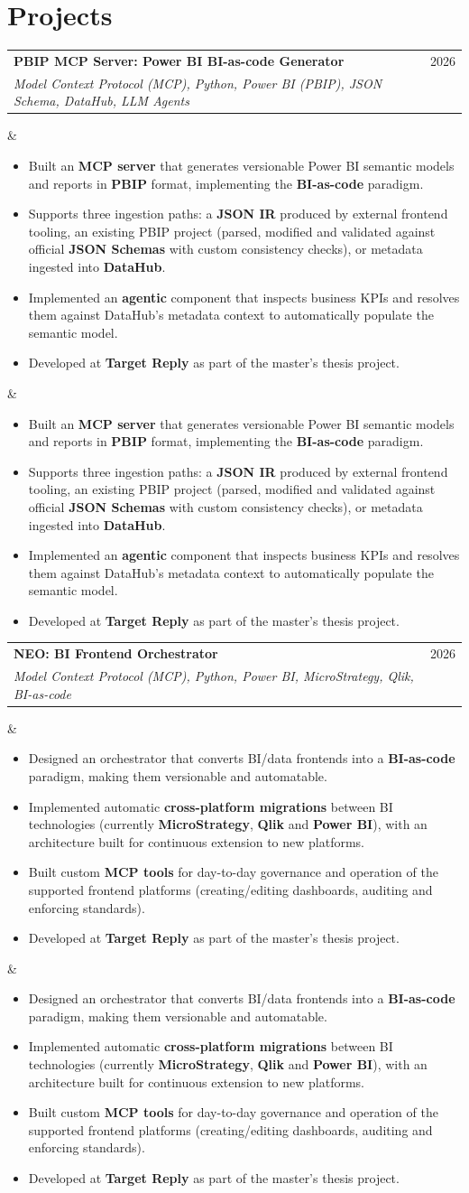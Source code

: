 \documentclass[10pt,a4paper]{article}
\makeatletter
\newcommand{\entry}[4]{%
  \noindent\begin{tabularx}{\linewidth}{@{}X r@{}}
    \textbf{#1} & #3 \\
    \textit{#2} & \\
  \end{tabularx}\vspace{-4pt}
  \ifx&#4&\else\par#4\fi
}
\makeatother
\begin{document}
\section*{Projects}

\entry{PBIP MCP Server: Power BI BI-as-code Generator}{Model Context Protocol (MCP), Python, Power BI (PBIP), JSON Schema, DataHub, LLM Agents}{2026}{%
\begin{itemize}
  \item Built an \textbf{MCP server} that generates versionable Power BI semantic models and reports in
        \textbf{PBIP} format, implementing the \textbf{BI-as-code} paradigm.
  \item Supports three ingestion paths: a \textbf{JSON IR} produced by external frontend tooling, an existing
        PBIP project (parsed, modified and validated against official \textbf{JSON Schemas} with custom
        consistency checks), or metadata ingested into \textbf{DataHub}.
  \item Implemented an \textbf{agentic} component that inspects business KPIs and resolves them against
        DataHub's metadata context to automatically populate the semantic model.
  \item Developed at \textbf{Target Reply} as part of the master's thesis project.
\end{itemize}}

\entry{NEO: BI Frontend Orchestrator}{Model Context Protocol (MCP), Python, Power BI, MicroStrategy, Qlik, BI-as-code}{2026}{%
\begin{itemize}
  \item Designed an orchestrator that converts BI/data frontends into a \textbf{BI-as-code} paradigm, making
        them versionable and automatable.
  \item Implemented automatic \textbf{cross-platform migrations} between BI technologies (currently
        \textbf{MicroStrategy}, \textbf{Qlik} and \textbf{Power BI}), with an architecture built for
        continuous extension to new platforms.
  \item Built custom \textbf{MCP tools} for day-to-day governance and operation of the supported frontend
        platforms (creating/editing dashboards, auditing and enforcing standards).
  \item Developed at \textbf{Target Reply} as part of the master's thesis project.
\end{itemize}}
\end{document}
